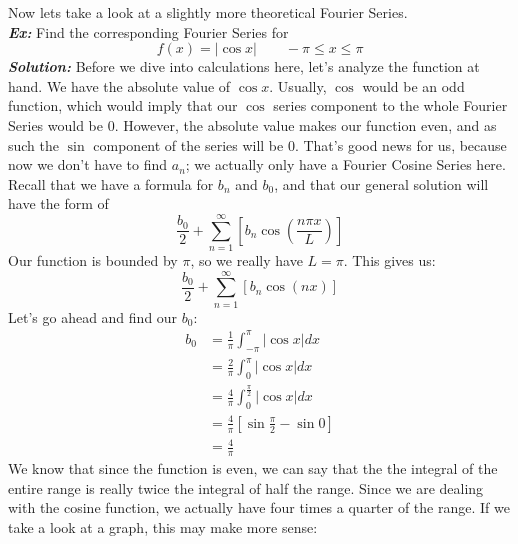 \newpage
\indent Now lets take a look at a slightly more theoretical Fourier Series.\\
\noindent\textbf{\textit{Ex:}} Find the corresponding Fourier Series for\\
\[f(x)=\left|\cos{x}\right|\qquad -\pi\leq x \leq \pi\]
\indent\textbf{\textit{Solution:}} Before we dive into calculations here, let's
analyze the function at hand. We have the absolute value of $\cos{x}$. Usually,
$\cos$ would be an odd function, which would imply that our $\cos$ series
component to the whole Fourier Series would be $0$. However, the absolute value
makes our function even, and as such the $\sin$ component of the series will be
$0$. That's good news for us, because now we don't have to find $a_{n}$; we
actually only have a Fourier Cosine Series here. Recall that we have a formula
for $b_{n}$ and $b_{0}$, and that our general solution will have the form of
\[\frac{b_{0}}{2} + \sum_{n=1}^{\infty}[b_{n}\cos{\left(\frac{n\pi x}{L}\right)}]\]
\noindent Our function is bounded by $\pi$, so we really have $L= \pi$. This gives us:
\[\frac{b_{0}}{2} + \sum_{n=1}^{\infty}[b_{n}\cos{\left(nx\right)}]\]
\noindent Let's go ahead and find our $b_{0}$:
\begin{align*}
b_{0} &= \frac{1}{\pi}\int_{-\pi}^{\pi}\left|\cos{x}\right|dx\\
&= \frac{2}{\pi}\int_{0}^{\pi}\left|\cos{x}\right|dx\\
&= \frac{4}{\pi}\int_{0}^{\frac{\pi}{2}}\left|\cos{x}\right|dx\\
&= \frac{4}{\pi}\left[\sin{\frac{\pi}{2}} - \sin{0}\right]\\
&= \frac{4}{\pi}
\end{align*}
\noindent We know that since the function is even, we can say that the the
integral of the entire range is really twice the integral of half the range.
Since we are dealing with the cosine function, we actually have four times a
quarter of the range. If we take a look at a graph, this may make more sense:\\
